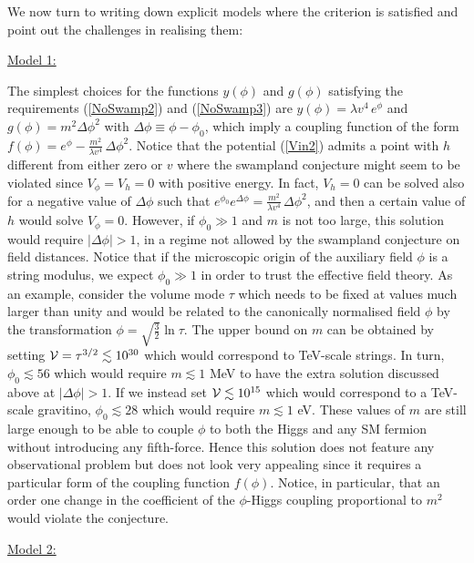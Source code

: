 \documentclass[11pt,a4paper]{article}
\newcommand{\vo}{\mathcal{V}}
\def\vo{{{\cal{V}}}}
\begin{document}
\begin{itemize}
We now turn to writing down explicit models where the criterion is satisfied and point out the challenges in realising them:

\underline{Model 1:}

The simplest choices for the functions $y(\phi)$ and $g(\phi)$ satisfying the requirements (\ref{NoSwamp2}) and (\ref{NoSwamp3}) are $y(\phi)=\lambda v^4\,e^\phi$ and $g(\phi)= m^2 \Delta\phi^2$ with $\Delta\phi\equiv\phi-\phi_0$, which imply a coupling function of the form $f(\phi) = e^{\phi} - \frac{m^2}{\lambda v^4}\,\Delta\phi^2$. Notice that the potential (\ref{Vin2}) admits a point with $h$ different from either zero or $v$ where the swampland conjecture might seem to be violated since $V_\phi=V_h=0$ with positive energy. In fact, $V_h=0$ can be solved also for a negative value of $\Delta\phi$ such that $e^{\phi_0} e^{\Delta\phi} = \frac{m^2}{\lambda v^4}\,\Delta\phi^2$, and then a certain value of $h$ would solve $V_\phi=0$. However, if $\phi_0\gg 1$ and $m$ is not too large, this solution would require $|\Delta\phi|>1$, in a regime not allowed by the swampland conjecture on field distances. Notice that if the microscopic origin of the auxiliary field $\phi$ is a string modulus, we expect $\phi_0\gg 1$ in order to trust the effective field theory. As an example, consider the volume mode $\tau$ which needs to be fixed at values much larger than unity and would be related to the canonically normalised field $\phi$ by the transformation $\phi = \sqrt{\frac32} \ln\tau$. The upper bound on $m$ can be obtained by setting $\vo=\tau^{3/2}\lesssim 10^{30}$ which would correspond to TeV-scale strings. In turn, $\phi_0\lesssim 56$ which would require $m\lesssim 1$ MeV to have the extra solution discussed above at $|\Delta\phi|>1$. If we instead set $\vo\lesssim 10^{15}$ which would correspond to a TeV-scale gravitino, $\phi_0\lesssim 28$ which would require $m\lesssim 1$ eV. These values of $m$ are still large enough to be able to couple $\phi$ to both the Higgs and any SM fermion without introducing any fifth-force. Hence this solution does not feature any observational problem but does not look very appealing since it requires a particular form of the coupling function $f(\phi)$. Notice, in particular, that an order one change in the coefficient of the $\phi$-Higgs coupling proportional to $m^2$ would violate the conjecture.

\underline{Model 2:}


\end{itemize}
\end{document}
